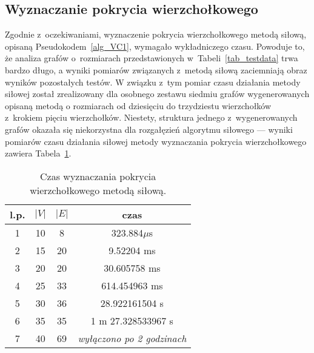 \subsection{Wyznaczanie pokrycia wierzchołkowego}
\par{
  Zgodnie z~oczekiwaniami, wyznaczenie pokrycia wierzchołkowego metodą siłową, opisaną Pseudokodem~\ref{alg_VC1}, wymagało wykładniczego czasu.
  Powoduje to, że analiza grafów o~rozmiarach przedstawionych w~Tabeli~\ref{tab_testdata} trwa bardzo długo, a wyniki pomiarów związanych z~metodą siłową zaciemniają obraz wyników pozostałych testów.
  W związku z~tym pomiar czasu działania metody siłowej został zrealizowany dla osobnego zestawu siedmiu grafów wygenerowanych opisaną metodą o rozmiarach od dziesięciu do trzydziestu wierzchołków z~krokiem pięciu wierzchołków.
  Niestety, struktura jednego z~wygenerowanych grafów okazała się niekorzystna dla rozgałęzień algorytmu siłowego --- wyniki pomiarów czasu działania siłowej metody wyznaczania pokrycia wierzchołkowego zawiera Tabela~\ref{tab_vc_naive}.
  \begin{table}
    \begin{center}
      \begin{tabular}{| c | c | c | c |}
        \hline
        l.p. & $|V|$ & $|E|$ & czas \\ \hline
        1 & 10 & 8 & 323.884$ \mu$s \\
        2 & 15 & 20 & 9.52204 ms \\
        3 & 20 & 20 & 30.605758 ms \\
        4 & 25 & 33 & 614.454963 ms \\
        5 & 30 & 36 & 28.922161504 s \\
        6 & 35 & 35 & 1 m 27.328533967 s \\
        7 & 40 & 69 & \textit{wyłączono po 2 godzinach} \\ \hline
      \end{tabular} 
    \end{center}
    \caption{Czas wyznaczania pokrycia wierzchołkowego metodą siłową.}
    \label{tab_vc_naive}
  \end{table}
}
